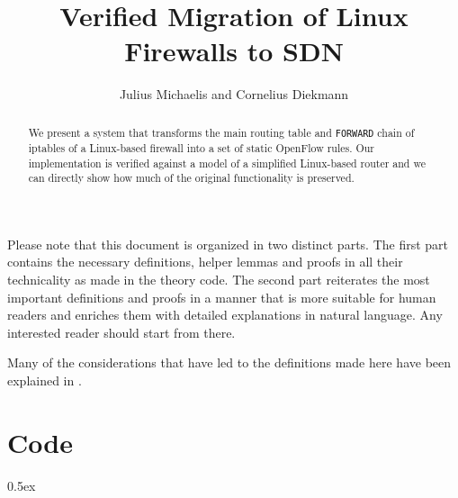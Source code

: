 \documentclass[a4paper]{article}
\begin{document}
\title{Verified Migration of Linux Firewalls to SDN}
\author{Julius Michaelis and Cornelius Diekmann}
\maketitle

\begin{abstract}
	We present a system that transforms the main routing table and \texttt{FORWARD} chain of iptables of a Linux-based firewall into a set of static OpenFlow rules.
	Our implementation is verified against a model of a simplified Linux-based router and we can directly show how much of the original functionality is preserved.
\end{abstract}
\vspace{1em}

Please note that this document is organized in two distinct parts.
The first part contains the necessary definitions, helper lemmas and proofs in all their technicality as made in the theory code.
The second part reiterates the most important definitions and proofs in a manner that is more suitable for human readers and enriches them with detailed explanations in natural language.
Any interested reader should start from there.

Many of the considerations that have led to the definitions made here have been explained in \cite{michaelis2016middlebox}.

\tableofcontents

\newpage

\part{Code}

\parindent 0pt\parskip 0.5ex








%
%
\end{document}
